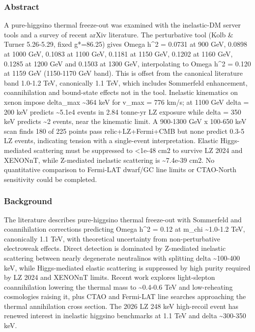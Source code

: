 \documentclass[11pt,a4paper]{article}
\begin{document}
\subsubsection*{Abstract}
A pure-higgsino thermal freeze-out was examined with the inelastic-DM server tools and a survey of recent arXiv literature. The perturbative tool (Kolb \& Turner 5.26-5.29, fixed g*=86.25) gives Omega h\textasciicircum{}2 = 0.0731 at 900 GeV, 0.0898 at 1000 GeV, 0.1083 at 1100 GeV, 0.1181 at 1150 GeV, 0.1202 at 1160 GeV, 0.1285 at 1200 GeV and 0.1503 at 1300 GeV, interpolating to Omega h\textasciicircum{}2 = 0.120 at 1159 GeV (1150-1170 GeV band). This is offset from the canonical literature band 1.0-1.2 TeV, canonically 1.1 TeV, which includes Sommerfeld enhancement, coannihilation and bound-state effects not in the tool. Inelastic kinematics on xenon impose delta\_max \textasciitilde{}364 keV for v\_max = 776 km/s; at 1100 GeV delta = 200 keV predicts \textasciitilde{}5.1e4 events in 2.84 tonne-yr LZ exposure while delta = 350 keV predicts \textasciitilde{}2 events, near the kinematic limit. A 900-1300 GeV x 100-650 keV scan finds 180 of 225 points pass relic+LZ+Fermi+CMB but none predict 0.3-5 LZ events, indicating tension with a single-event interpretation. Elastic Higgs-mediated scattering must be suppressed to \textless{}1e-48 cm2 to survive LZ 2024 and XENONnT, while Z-mediated inelastic scattering is \textasciitilde{}7.4e-39 cm2. No quantitative comparison to Fermi-LAT dwarf/GC line limits or CTAO-North sensitivity could be completed.

\subsubsection*{Background}
The literature describes pure-higgsino thermal freeze-out with Sommerfeld and coannihilation corrections predicting Omega h\textasciicircum{}2 = 0.12 at m\_chi \textasciitilde{}1.0-1.2 TeV, canonically 1.1 TeV, with theoretical uncertainty from non-perturbative electroweak effects. Direct detection is dominated by Z-mediated inelastic scattering between nearly degenerate neutralinos with splitting delta \textasciitilde{}100-400 keV, while Higgs-mediated elastic scattering is suppressed by high purity required by LZ 2024 and XENONnT limits. Recent work explores light-slepton coannihilation lowering the thermal mass to \textasciitilde{}0.4-0.6 TeV and low-reheating cosmologies raising it, plus CTAO and Fermi-LAT line searches approaching the thermal annihilation cross section. The 2026 LZ 248 keV high-recoil event has renewed interest in inelastic higgsino benchmarks at 1.1 TeV and delta \textasciitilde{}300-350 keV.
\end{document}
